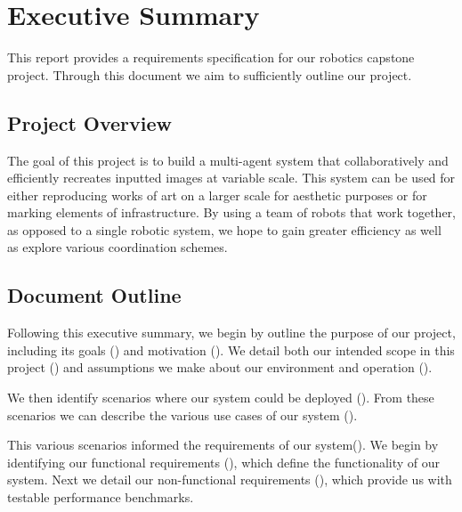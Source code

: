 
\section {Executive Summary}
\label{sec:executive_summary}
This report provides a requirements specification for our robotics capstone project. Through this document we aim to sufficiently outline our project. 

\subsection{Project Overview}
The goal of this project is to build a multi-agent system that collaboratively and efficiently recreates inputted images at variable scale. 
This system can be used for either reproducing works of art on a larger scale for aesthetic purposes or for marking elements of infrastructure. 
By using a team of robots that work together, as opposed to a single robotic system, we hope to gain greater efficiency as well as explore various coordination schemes. 


\subsection{Document Outline}
Following this executive summary, we begin by outline the purpose of our project, including its goals () and motivation (). 
We detail both our intended scope in this project () and assumptions we make about our environment and operation (). 

We then identify scenarios where our system could be deployed (). 
From these scenarios we can describe the various use cases of our system ().

This various scenarios informed the requirements of our system(). 
We begin by identifying our functional requirements (), which define the functionality of our system. 
Next we detail our non-functional requirements (), which provide us with testable performance benchmarks.

